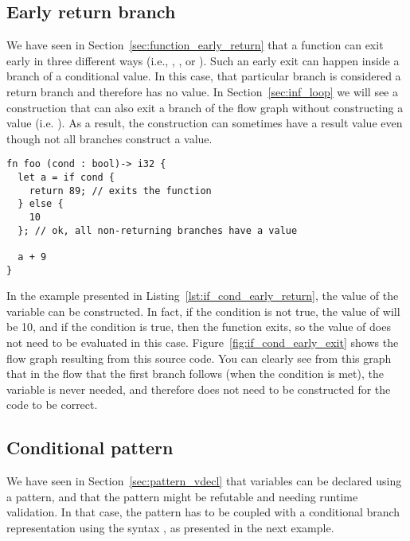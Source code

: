 \subsection{Early return branch}

We have seen in Section~\ref{sec:function_early_return} that a function can exit
early in three different ways (i.e., , , or
). Such an early exit can happen inside a branch of a conditional
value. In this case, that particular branch is considered a return branch and
therefore has no value. In Section~\ref{sec:inf_loop} we will see a construction
that can also exit a branch of the flow graph without constructing a value (i.e.
). As a result, the  construction can sometimes have a
result value even though not all branches construct a value.




\begin{lstlisting}[style=coloredverbatim, caption=Early return in \token{if} condition, label=lst:if_cond_early_return]
fn foo (cond : bool)-> i32 {
  let a = if cond {
    return 89; // exits the function
  } else {
    10
  }; // ok, all non-returning branches have a value

  a + 9
}
\end{lstlisting}

In the example presented in Listing~\ref{lst:if_cond_early_return}, the value of
the variable  can be constructed. In fact, if the condition is not
true, the value of  will be 10, and if the condition is true, then the
function exits, so the value of  does not need to be evaluated in this
case. Figure~\ref{fig:if_cond_early_exit} shows the flow graph resulting from
this source code. You can clearly see from this graph that in the flow that the
first branch follows (when the condition is met), the variable  is
never needed, and therefore does not need to be constructed for the code to be
correct.


\subsection {Conditional pattern}
\label{sec:cond_pattern}

We have seen in Section~\ref{sec:pattern_vdecl} that variables can be declared
using a pattern, and that the pattern might be refutable and needing runtime
validation. In that case, the pattern has to be coupled with a conditional
branch representation using the syntax , as
presented in the next example.

